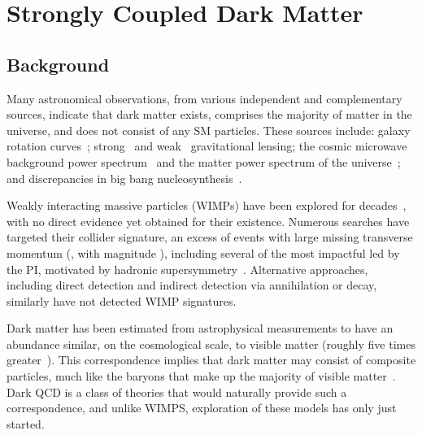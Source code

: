 \section{Strongly Coupled Dark Matter}\label{sec:darkqcd}

\subsection{Background}\label{subsec:dmbkg}

Many astronomical observations, from various independent and complementary sources,
indicate that dark matter exists, comprises the majority of matter in the universe, and does not consist of any SM particles.
These sources include:
galaxy rotation curves~\cite{Rubin:1980zd,Persic:1995ru,vanDokkum:2018vup,PinaMancera:2021wpc};
strong~\cite{Clowe:2006eq} and weak~\cite{Chang:2017kmv} gravitational lensing;
the cosmic microwave background power spectrum~\cite{Planck:2018vyg} and the matter power spectrum of the universe~\cite{Dodelson:2011qv,Planck:2018nkj};
and discrepancies in big bang nucleosynthesis~\cite{Pospelov:2010hj}.

Weakly interacting massive particles (WIMPs) have been explored for decades~\cite{Jungman:1995df}, with no direct evidence yet obtained for their existence.
Numerous searches have targeted their collider signature, an excess of events with large missing transverse momentum (\ptvecmiss, with magnitude \ptmiss),
including several of the most impactful led by the PI, motivated by hadronic supersymmetry~\cite{Khachatryan:2016kdk,Sirunyan:2017cwe,Sirunyan:2019hzr,Sirunyan:2019ctn,CMS:2023xlp}.
Alternative approaches, including direct detection and indirect detection via annihilation or decay, similarly have not detected WIMP signatures.

Dark matter has been estimated from astrophysical measurements to have an abundance similar,
on the cosmological scale, to visible matter (roughly five times greater~\cite{Ade:2015xua}).
This correspondence implies that dark matter may consist of composite particles, much like the baryons that make up the majority of visible matter~\cite{Bai:2013xga,Bodas:2024idn}.
Dark QCD is a class of theories that would naturally provide such a correspondence,
and unlike WIMPS, exploration of these models has only just started.

